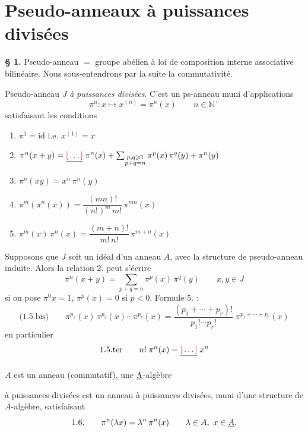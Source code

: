 \documentclass[11pt,a4paper]{article}
\begin{document}

\section{Pseudo-anneaux à puissances divisées}

\textbf{§ 1.} Pseudo-anneau $=$ groupe abélien à loi de composition interne
associative bilinéaire. Nous sous-entendrons par la suite la commutativité.

Pseudo-anneau $J$ \emph{à puissances divisées}. C'est un ps-anneau muni
d'applications 
\[
  \pi^{n} : x \mapsto x^{(n)} = \pi^{n}(x) \qquad n \in \mathbb{N}^{+}
\]
satisfaisant les conditions
\begin{enumerate}
  \item[1.1.] $\pi^{1} = \mathrm{id}$ \quad i.e. $x^{(1)} = x$
  \item[1.2.] $\pi^{n}(x+y) = \struck{\ill{}}\; \pi^{n}(x) + \sum_{\substack{p,q \geqslant 1 \\ p+q = n}} \pi^{p}(x)\,\pi^{q}(y) + \pi^{n}(y)$
  \item[1.3.] $\pi^{n}(xy) = x^{n}\,\pi^{n}(y)$
  \item[1.4.] $\pi^{m}(\pi^{n}(x)) = \dfrac{(mn)!}{(n!)^{m}\, m!}\, \pi^{mn}(x)$
  \item[1.5.] $\pi^{m}(x)\,\pi^{n}(x) = \dfrac{(m+n)!}{m!\, n!}\, \pi^{m+n}(x)$
\end{enumerate}

Supposons que $J$ soit un idéal d'un anneau $A$, avec la structure de
pseudo-anneau induite. Alors la relation 2. peut s'écrire
\[
  \pi^{n}(x+y) = \sum_{p+q=n} \pi^{p}(x)\,\pi^{q}(y) \qquad x, y \in J
\]
si on pose $\pi^{0}x = 1$, $\pi^{p}(x) = 0$ si $p < 0$. Formule 5.
 :
\[
  \text{(1.5.bis)}\qquad \pi^{p_{1}}(x)\,\pi^{p_{2}}(x) \cdots \pi^{p_{r}}(x)
  = \frac{(p_{1} + \cdots + p_{r})!}{p_{1}! \cdots p_{r}!}\; \pi^{p_{1} + \cdots + p_{r}}(x)
\]
en particulier
\[
  \text{1.5.ter}\qquad n!\; \pi^{n}(x) = \struck{\ill{}}\; x^{n}
\]

\struck{\ill{}} $A$ est un anneau (commutatif), une $\uncertain{\Lambda}$-algèbre

à puissances divisées est un anneau à puissances divisées, muni
d'une structure de $A$-algèbre, satisfaisant
\[
  \text{1.6.}\qquad \pi^{n}(\lambda x) = \lambda^{n}\, \pi^{n}(x) \qquad \lambda \in A,\ x \in \struck{A}.
\]
\end{document}
